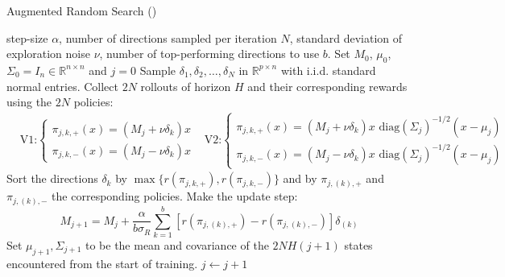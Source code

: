             \begin{algorithm}[htbp]
            \caption{Augmented Random Search (\cite{mania2018simple})}
            \begin{algorithmic}[1]
            \State {} step-size $\alpha$, number of directions sampled per iteration $N$, standard deviation of exploration noise $\nu$, number of top-performing directions to use $b$.
            \State {} Set $M_0$, $\mu_0$, $\Sigma_0 = I_n \in \mathbb{R}^{n \times n}$ and $j = 0$
                \State Sample $\delta_1, \delta_2, \ldots, \delta_N$ in $\mathbb{R}^{p \times n}$ with i.i.d. standard normal entries.
                \State Collect $2N$ rollouts of horizon $H$ and their corresponding rewards using the $2N$ policies:
                \begin{align*}
                &\text{V1:}
                    \begin{cases} 
                        \pi_{j,k,+}(x) = (M_j + \nu \delta_k)x \\
                        \pi_{j,k,-}(x) = (M_j - \nu \delta_k)x
                    \end{cases}
                &\text{V2:}
                    \begin{cases} 
                        \pi_{j,k,+}(x) = (M_j + \nu \delta_k)x\text{ diag}(\Sigma_j)^{-1/2}(x - \mu_j) \\
                        \pi_{j,k,-}(x) = (M_j - \nu \delta_k)x\text{ diag}(\Sigma_j)^{-1/2}(x - \mu_j)
                    \end{cases}
                \end{align*}
                \State Sort the directions $\delta_k$ by $\max\{r(\pi_{j,k,+}), r(\pi_{j,k,-})\}$ and by $\pi_{j,(k),+}$ and $\pi_{j,(k),-}$ the corresponding policies.
                \State Make the update step:
                $$
                M_{j+1} = M_j + \frac{\alpha}{b\sigma_R} \sum_{k=1}^b \left [r(\pi_{j,(k),+}) - r(\pi_{j,(k),-}) \right ] \delta_{(k)}
                $$
                \State Set $\mu_{j+1}, \Sigma_{j+1}$ to be the mean and covariance of the $2N H (j + 1)$ states encountered from the start of training.
                \State $j \leftarrow j + 1$
            \EndWhile
            \end{algorithmic}
            \end{algorithm}
            
            \bigskip
            
